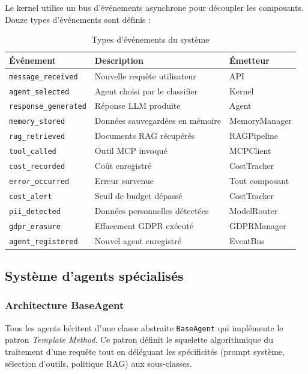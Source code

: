 \documentclass[12pt, a4paper]{article}
\begin{document}
Le kernel utilise un bus d'événements asynchrone pour découpler les composants. Douze types d'événements sont définis :

\begin{table}[H]
\centering
\caption{Types d'événements du système}
\label{tab:events}
\small
\begin{tabularx}{\textwidth}{l X l}
\toprule
\textbf{Événement} & \textbf{Description} & \textbf{Émetteur} \\
\midrule
\texttt{message\_received} & Nouvelle requête utilisateur & API \\
\texttt{agent\_selected} & Agent choisi par le classifier & Kernel \\
\texttt{response\_generated} & Réponse LLM produite & Agent \\
\texttt{memory\_stored} & Données sauvegardées en mémoire & MemoryManager \\
\texttt{rag\_retrieved} & Documents RAG récupérés & RAGPipeline \\
\texttt{tool\_called} & Outil MCP invoqué & MCPClient \\
\texttt{cost\_recorded} & Coût enregistré & CostTracker \\
\texttt{error\_occurred} & Erreur survenue & Tout composant \\
\texttt{cost\_alert} & Seuil de budget dépassé & CostTracker \\
\texttt{pii\_detected} & Données personnelles détectées & ModelRouter \\
\texttt{gdpr\_erasure} & Effacement GDPR exécuté & GDPRManager \\
\texttt{agent\_registered} & Nouvel agent enregistré & EventBus \\
\bottomrule
\end{tabularx}
\end{table}

\subsection{Système d'agents spécialisés}

\subsubsection{Architecture BaseAgent}

Tous les agents héritent d'une classe abstraite \texttt{BaseAgent} qui implémente le patron \textit{Template Method}. Ce patron définit le squelette algorithmique du traitement d'une requête tout en déléguant les spécificités (prompt système, sélection d'outils, politique RAG) aux sous-classes.
\end{document}
